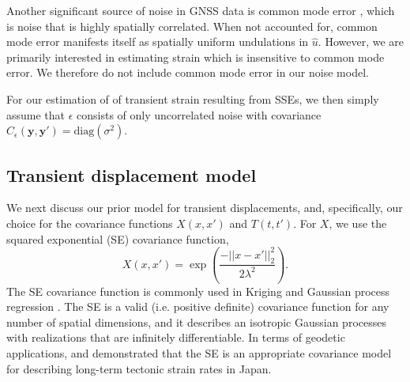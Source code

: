 \documentclass[10pt,a4paper]{article}
\begin{document}
Another significant source of noise in GNSS data is common mode error \citep[e.g.,][]{Wdowinski1997,Dong2006}, which is noise that is highly spatially correlated. When not accounted for, common mode error manifests itself as spatially uniform undulations in $\hat{u}$. However, we are primarily interested in estimating strain which is insensitive to common mode error. We therefore do not include common mode error in our noise model. 

For our estimation of of transient strain resulting from SSEs, we then simply assume that $\epsilon$ consists of only uncorrelated noise with covariance $C_\epsilon(\bm{y},\bm{y}') = \mathrm{diag}(\sigma^2)$.            

\subsection{Transient displacement model}\label{sec:SignalModel}
We next discuss our prior model for transient displacements, and, specifically, our choice for the covariance functions $X(x,x')$ and $T(t,t')$. For $X$, we use the squared exponential (SE) covariance function,
\begin{equation}\label{eq:SE}
X(x,x') = \exp\left(\frac{-||x - x'||_2^2}{2 \lambda^2}\right).
\end{equation}
The SE covariance function is commonly used in Kriging \citep[e.g,][]{Cressie1992} and Gaussian process regression \citep[e.g.,][]{Rasmussen2006}.  The SE is a valid (i.e. positive definite) covariance function for any number of spatial dimensions, and it describes an isotropic Gaussian processes with realizations that are infinitely differentiable. In terms of geodetic applications, \citet{Kato1998} and \cite{El-Fiky1999} demonstrated that the SE is an appropriate covariance model for describing long-term tectonic strain rates in Japan.  
\end{document}
